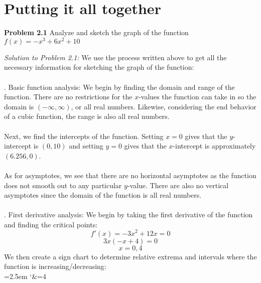 \documentclass[11pt]{scrartcl}
\begin{document}
\section{Putting it all together}
\noindent 
\begin{tcolorbox}
[colback=purple!5!white,colframe=purple!75!black]
\textbf{Problem 2.1} Analyze and sketch the graph of the function $f(x)=-x^3+6x^2+10$
\end{tcolorbox}
\noindent 
\textit{Solution to Problem 2.1:} We use the process written above to get all the necessary information for sketching the graph of the function: \\
\\
. Basic function analysis: We begin by finding the domain and range of the function. There are no restrictions for the $x$-values the function can take in so the domain is $(-\infty, \infty)$, or all real numbers. Likewise, considering the end behavior of a cubic function, the range is also all real numbers. \\
\\
\noindent 
Next, we find the intercepts of the function. Setting $x=0$ gives that the $y$-intercept is $(0,10)$ and setting $y=0$ gives that the $x$-intercept is approximately $(6.256, 0)$. \\
\\
\noindent 
As for asymptotes, we see that there are no horizontal asymptotes as the function does not smooth out to any particular $y$-value. There are also no vertical asymptotes since the domain of the function is all real numbers. 
\\
\\
. First derivative analysis: We begin by taking the first derivative of the function and finding the critical points: 
$$f'(x)=-3x^2+12x=0$$
$$3x(-x+4)=0$$
$$x=0,4$$
\noindent 
We then create a sign chart to determine relative extrema and intervals where the function is increasing/decreasing: \\
\newdimen\tcolw \tcolw=2.5em %
\edef\ecatcode{\catcode`&=\the\catcode`&\relax}\catcode`&=4
\def\sgchart#1#2{\vbox{\offinterlineskip\halign{\hfil##\quad&##\hfil\crcr\sgchartA#2,:,%
   \omit\sgchartR&\kern.2pt\sgchartS{.5\tcolw}\relax\sgchartE#1,\relax,%
   \sgchartS{.5\tcolw}\relax\cr
   \noalign{\kern2pt}&\def~{}\kern.5\tcolw\sgchartD#1,\relax,\cr}}}
\def\sgchartA#1:#2,{\cr\ifx,#1,\else $#1$&\sgchartB#2{}\expandafter\sgchartA\fi}
\def\sgchartB#1{\hbox to\tcolw{\hss$#1$\hss}\sgchartC}
\def\sgchartC#1{\ifx,#1,\else
   \strut\vrule\kern-.4pt\hbox to\tcolw{\hss$#1$\hss}\expandafter\sgchartC\fi}
\end{document}
